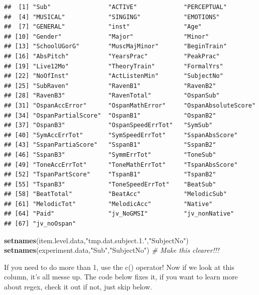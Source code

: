 \documentclass[]{book}
\newenvironment{Shaded}{\begin{snugshade}}{\end{snugshade}}
\newcommand{\KeywordTok}[1]{\textcolor[rgb]{0.13,0.29,0.53}{\textbf{#1}}}
\newcommand{\StringTok}[1]{\textcolor[rgb]{0.31,0.60,0.02}{#1}}
\newcommand{\CommentTok}[1]{\textcolor[rgb]{0.56,0.35,0.01}{\textit{#1}}}
\newcommand{\NormalTok}[1]{#1}
\theoremstyle{definition}
\theoremstyle{definition}
\theoremstyle{definition}
\theoremstyle{remark}
\begin{document}
\begin{verbatim}
##  [1] "Sub"                "ACTIVE"             "PERCEPTUAL"        
##  [4] "MUSICAL"            "SINGING"            "EMOTIONS"          
##  [7] "GENERAL"            "inst"               "Age"               
## [10] "Gender"             "Major"              "Minor"             
## [13] "SchoolUGorG"        "MuscMajMinor"       "BeginTrain"        
## [16] "AbsPitch"           "YearsPrac"          "PeakPrac"          
## [19] "Live12Mo"           "TheoryTrain"        "FormalYrs"         
## [22] "NoOfInst"           "ActListenMin"       "SubjectNo"         
## [25] "SubRaven"           "RavenB1"            "RavenB2"           
## [28] "RavenB3"            "RavenTotal"         "OspanSub"          
## [31] "OspanAccError"      "OspanMathError"     "OspanAbsoluteScore"
## [34] "OspanPartialScore"  "OspanB1"            "OspanB2"           
## [37] "OspanB3"            "OspanSpeedErrTot"   "SymSub"            
## [40] "SymAccErrTot"       "SymSpeedErrTot"     "SspanAbsScore"     
## [43] "SspanPartiaScore"   "SspanB1"            "SspanB2"           
## [46] "SspanB3"            "SymmErrTot"         "ToneSub"           
## [49] "ToneAccErrTot"      "ToneMathErrTot"     "TspanAbsScore"     
## [52] "TspanPartScore"     "TspanB1"            "TspanB2"           
## [55] "TspanB3"            "ToneSpeedErrTot"    "BeatSub"           
## [58] "BeatTotal"          "BeatAcc"            "MelodicSub"        
## [61] "MelodicTot"         "MelodicAcc"         "Native"            
## [64] "Paid"               "jv_NoGMSI"          "jv_nonNative"      
## [67] "jv_noOspan"
\end{verbatim}

\begin{Shaded}
\begin{Highlighting}[]
\KeywordTok{setnames}\NormalTok{(item.level.data,}\StringTok{"tmp.dat.subject.1."}\NormalTok{,}\StringTok{"SubjectNo"}\NormalTok{)}
\KeywordTok{setnames}\NormalTok{(experiment.data,}\StringTok{"Sub"}\NormalTok{,}\StringTok{"SubjectNo"}\NormalTok{) }\CommentTok{# Make this clearer!!! }
\end{Highlighting}
\end{Shaded}

If you need to do more than 1, use the c() operator! Now if we look at
this column, it's all messe up. The code below fixes it, if you want to
learn more about regex, check it out if not, just skip below.
\end{document}
